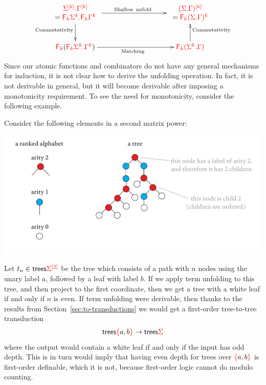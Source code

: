     \begin{align*}
        \xymatrix@C=3.2cm{
          {\begin{array}{c}
          \shallowterm{\mati k \rSigma} {\mati k \rGamma} \\{=\shallowterm{\reduce k {\Sigma^k}}{\reduce k {\Gamma^k}}}
          \end{array}}  \ar[d]_{{\mathrm{Commutativity}}}\ar[r]^{\mathrm{Shallow\  unfold}} &  {\begin{array}{c}
         \ranked{\mati k {(\shallowterm \Sigma \Gamma)}} \\=  \ranked{ \reduce k(\shallowterm{\Sigma}{ {\Gamma}})^k}
          \end{array}} \\
             \reduce k(\shallowterm{\reduce k {\Sigma^k}}{ {\Gamma^k}})  \ar[r]_{{\mathrm{Matching}}} &  \ranked{ \reduce k(\shallowterm{\Sigma^k}{ {\Gamma}}) } \ar[u]_{\mathrm{Commutativity}} 
        } 
    \end{align*}
Since our atomic functions and combinators do not have any general mechanisms for induction, it is not clear how to derive the unfolding operation. In fact, it is not derivable in general, but it will become derivable after imposing a monotonicity requirement.   To see the need for monotonicity, consider the following example.
\begin{example}\label{eq:twist}
    Consider the following elements in a second matrix power:
\begin{center}
\includegraphics[scale=.3, page=84]{pics.pdf}
\end{center}
Let $t_n \in \mathsf {trees} {\color{red}{\Sigma}}^{{\color{red}{[2]}}}$ be the tree which consists of a path with $n$ nodes using the unary label $a$, followed by a leaf with label $b$. If we apply term unfolding to this tree, and then project to the first coordinate, then we get a tree with a white leaf if and only if  $n$ is even.  If term unfolding were derivable, then thanks to the results from Section~\ref{sec:to-transductions}  we would get a first-order tree-to-tree transduction 
\begin{align*}
\mathsf {trees} {\color{red}{\{}}a,b {\color{red}{\}}} \to \mathsf {trees} {\color{red}{\Sigma}}
\end{align*}
where the output would contain a white leaf if and only if the input has odd depth. This is in turn would imply that having even depth for trees over ${\color{red}{\{}}a,b {\color{red}{\}}}$ is first-order definable, which it is not, because first-order logic cannot do modulo counting.
\end{example}


